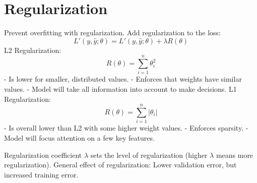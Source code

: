 \documentclass{scrartcl}
\begin{document}
\section*{Regularization}
Prevent overfitting with regularization.
Add regularization to the loss:
$$L'(y, \hat{y}; \theta) = L'(y, \hat{y}; \theta) + \lambda R(\theta)$$
L2 Regularization:
$$R(\theta) = \sum_{i=1}^{n} \theta^2_i$$
- Is lower for smaller, distributed values.
- Enforces that weights have similar values.
- Model will take all information into account to make decisions.
L1 Regularization:
$$R(\theta) = \sum_{i=1}^{n} |\theta_i|$$
- Is overall lower than L2 with some higher weight values.
- Enforces sparsity.
- Model will focus attention on a few key features.

Regularization coefficient $\lambda$ sets the level of regularization (higher $\lambda$ means more regularization).
General effect of regularization: Lower validation error, but increased training error.
\end{document}
